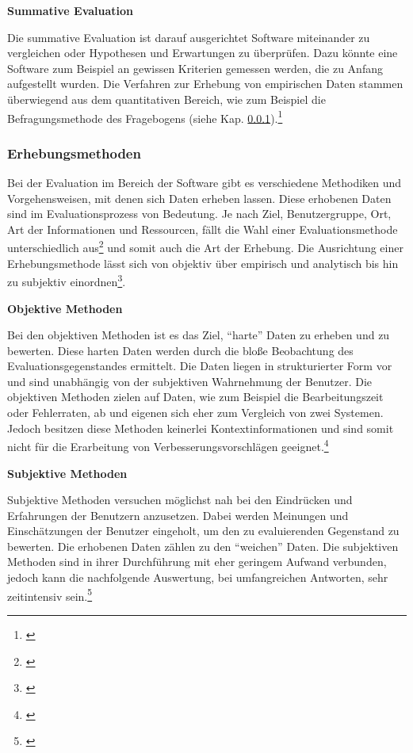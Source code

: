 \textbf{Summative Evaluation}

Die summative Evaluation ist darauf ausgerichtet Software miteinander zu vergleichen oder Hypothesen und Erwartungen zu überprüfen. Dazu könnte eine Software zum Beispiel an gewissen Kriterien gemessen werden, die zu Anfang aufgestellt wurden. Die Verfahren zur Erhebung von empirischen Daten stammen überwiegend aus dem quantitativen Bereich, wie zum Beispiel die Befragungsmethode des Fragebogens (siehe Kap. \ref{sec:erhebungsmethoden}).\footnote{\cite[vgl.][8]{Hegner2003}}


\subsubsection{Erhebungsmethoden}
\label{sec:erhebungsmethoden}
Bei der Evaluation im Bereich der Software gibt es verschiedene Methodiken und Vorgehensweisen, mit denen sich Daten erheben lassen. Diese erhobenen Daten sind im Evaluationsprozess von Bedeutung. Je nach Ziel, Benutzergruppe, Ort, Art der Informationen und Ressourcen, fällt die Wahl einer Evaluationsmethode unterschiedlich aus\footnote{\cite[vgl.][10]{Hegner2003}} und somit auch die Art der Erhebung. Die Ausrichtung einer Erhebungsmethode lässt sich von objektiv über empirisch und analytisch bis hin zu subjektiv einordnen\footnote{\cite[vgl.][15]{Hegner2003}}.

\textbf{Objektive Methoden}

Bei den objektiven Methoden ist es das Ziel, \enquote{harte} Daten zu erheben und zu bewerten. Diese harten Daten werden durch die bloße Beobachtung des Evaluationsgegenstandes ermittelt. Die Daten liegen in strukturierter Form vor und sind unabhängig von der subjektiven Wahrnehmung der Benutzer. Die objektiven Methoden zielen auf Daten, wie zum Beispiel die Bearbeitungszeit oder Fehlerraten, ab und eigenen sich eher zum Vergleich von zwei Systemen. Jedoch besitzen diese Methoden keinerlei Kontextinformationen und sind somit nicht für die Erarbeitung von Verbesserungsvorschlägen geeignet.\footnote{\cite[vgl.][17]{Hegner2003}}

\textbf{Subjektive Methoden}

Subjektive Methoden versuchen möglichst nah bei den Eindrücken und Erfahrungen der Benutzern anzusetzen. Dabei werden Meinungen und Einschätzungen der Benutzer eingeholt, um den zu evaluierenden Gegenstand zu bewerten. Die erhobenen Daten zählen zu den \enquote{weichen} Daten. Die subjektiven Methoden sind in ihrer Durchführung mit eher geringem Aufwand verbunden, jedoch kann die nachfolgende Auswertung, bei umfangreichen Antworten, sehr zeitintensiv sein.\footnote{\cite[vgl.][18]{Hegner2003}}

